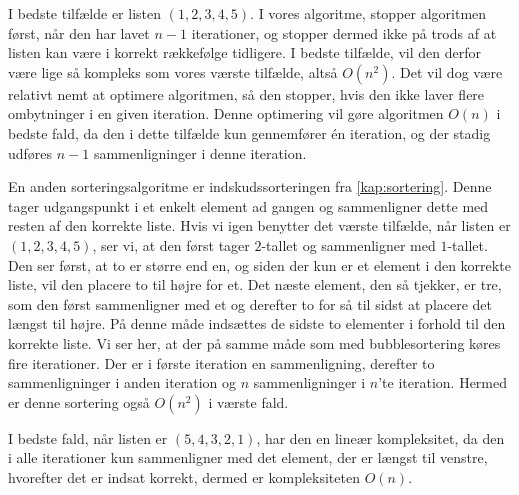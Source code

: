 I bedste tilfælde er listen $(1, 2, 3, 4, 5)$.
I vores algoritme, stopper algoritmen først, når den har lavet $n-1$ iterationer, og stopper dermed ikke på trods af at listen kan være i korrekt rækkefølge tidligere. I bedste tilfælde, vil den derfor være lige så kompleks som vores værste tilfælde, altså $O(n^2)$. Det vil dog være relativt nemt at optimere algoritmen, så den stopper, hvis den ikke laver flere ombytninger i en given iteration. Denne optimering vil gøre algoritmen $O(n)$ i bedste fald, da den i dette tilfælde kun gennemfører én iteration, og der stadig udføres $n-1$ sammenligninger i denne iteration. 

En anden sorteringsalgoritme er indskudssorteringen fra \autoref{kap:sortering}. Denne tager udgangspunkt i et enkelt element ad gangen og sammenligner dette med resten af den korrekte liste.
Hvis vi igen benytter det værste tilfælde, når listen er $(1,2,3,4,5)$, ser vi, at den først tager $2$-tallet og sammenligner med $1$-tallet. Den ser først, at to er større end en, og siden der kun er et element i den korrekte liste, vil den placere to til højre for et. Det næste element, den så tjekker, er tre, som den først sammenligner med et og derefter to for så til sidst at placere det længst til højre. På denne måde indsættes de sidste to elementer i forhold til den korrekte liste.
Vi ser her, at der på samme måde som med bubblesortering køres fire iterationer. Der er i første iteration en sammenligning, derefter to sammenligninger i anden iteration og $n$ sammenligninger i $n$'te iteration. Hermed er denne sortering også $O(n^2)$ i værste fald.


I bedste fald, når listen er $(5,4,3,2,1)$, har den en lineær kompleksitet, da den i alle iterationer kun sammenligner med det element, der er længst til venstre, hvorefter det er indsat korrekt, dermed er kompleksiteten $O(n)$.





